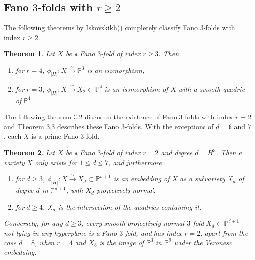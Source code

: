 \documentclass[11pt]{amsart}
\theoremstyle{plain}
\newtheorem{theorem}{Theorem}[section]
\theoremstyle{definition}
\theoremstyle{expl}
\begin{document}
\subsection{Fano $3$-folds with $r\geq2$}
The following theorems by Iskovskikh(\cite{Isk77}) completely classify Fano $3$-folds with index $r\geq 2$. 
\begin{theorem}
Let $X$ be a Fano $3$-fold of index $r\geq 3$. Then
\begin{enumerate}
\item[(i)] for $r =4$, $\phi_{|H|}: X \xrightarrow{\sim} \mathbb{P}^3$ is an isomorphism,
\item[(ii)] for $r=3$, $\phi_{|H|}: X \xrightarrow{\sim} X_2\subset \mathbb{P}^4$ is an isomorphism of $X$ with a smooth quadric of $\mathbb{P}^4$.
\end{enumerate}
\end{theorem}
The following theorem 3.2 discusses the existence of Fano $3$-folds with index $r=2$ and Theorem 3.3 describes these Fano $3$-folds. With the exceptions of $d=6$ and $7$, each $X$ is a prime Fano $3$-fold.  
\begin{theorem} Let $X$ be a Fano $3$-fold of index $r=2$ and degree $d=H^3$. Then 
        a variety $X$ only exists for $1\leq d \leq 7$, and furthermore
        \begin{enumerate}
        \item[(i)] for $d\geq 3$, $\phi_{|H|}: X \xrightarrow{\sim}X_d \subset \mathbb{P}^{d+1}$ is an embedding of $X$ as a subvariety $X_d$ of degree $d$ in $\mathbb{P}^{d+1}$, with $X_d$ projectively normal.
        \item[(ii)] for $d\geq 4$, $X_d$ is the intersection of the quadrics containing it.
        \end{enumerate} 
        Conversely, for any $d\geq 3$, every smooth projectively normal $3$-fold $X_d \subset \mathbb{P}^{d+1}$ not lying in any hyperplane is a Fano $3$-fold, and has index $r=2$, apart from the case $d=8$, when $r=4$ and $X_8$ is the image of $\mathbb{P}^3$ in $\mathbb{P}^9$ under the Veronese embedding.
\end{theorem}
\end{document}

